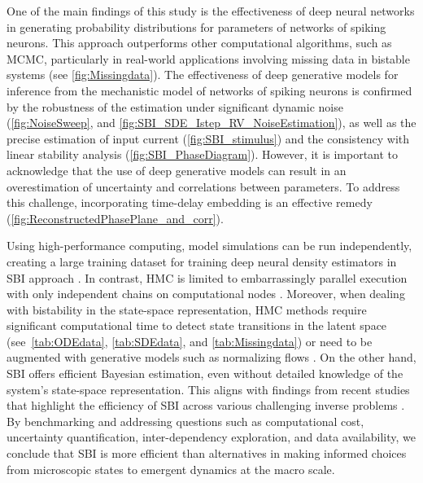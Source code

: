 \documentclass[12pt]{article}
\begin{document}
One of the main findings of this study is the effectiveness of deep neural networks in generating probability distributions for parameters of networks of spiking neurons. This approach outperforms other computational algorithms, such as MCMC, particularly in real-world applications involving missing data in bistable systems (see \autoref{fig:Missingdata}). The effectiveness of deep generative models for inference from the mechanistic model of networks of spiking neurons is confirmed by the robustness of the estimation under significant dynamic noise (\autoref{fig:NoiseSweep}, and \autoref{fig:SBI_SDE_Istep_RV_NoiseEstimation}), as well as the precise estimation of input current (\autoref{fig:SBI_stimulus}) and the consistency with linear stability analysis (\autoref{fig:SBI_PhaseDiagram}). However, it is important to acknowledge that the use of deep generative models can result in an overestimation of uncertainty and correlations between parameters. To address this challenge, incorporating time-delay embedding is an effective remedy (\autoref{fig:ReconstructedPhasePlane_and_corr}). 


Using high-performance computing, model simulations can be run independently, creating a large training dataset for training deep neural density estimators in SBI approach \citep{Hashemi2023}. In contrast, HMC is limited to embarrassingly parallel execution with only independent chains on computational nodes \citep{Hashemi2021}. Moreover, when dealing with bistability in the state-space representation, HMC methods require significant computational time to detect state transitions in the latent space (see~\autoref{tab:ODEdata}, \autoref{tab:SDEdata}, and \autoref{tab:Missingdata}) or need to be augmented with generative models such as normalizing flows \citep{Hoffman2019, Gabrie2022}. On the other hand, SBI offers efficient Bayesian estimation, even without detailed knowledge of the system's state-space representation. This aligns with findings from recent studies that highlight the efficiency of SBI across various challenging inverse problems \citep{Goncalves2020, Deistler2022, Boelts2022, Boelts2023, Hashemi2023, Lavanga2023, Yalccinkaya2023, Rabuffo2023, Sorrentino2023}. By benchmarking and addressing questions such as computational cost, uncertainty quantification, inter-dependency exploration, and data availability, we conclude that SBI is more efficient than alternatives in making informed choices from microscopic states to emergent dynamics at the macro scale. 
\end{document}
